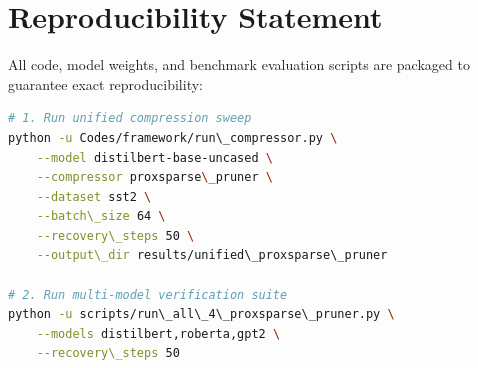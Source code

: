 \section{Reproducibility Statement}
All code, model weights, and benchmark evaluation scripts are packaged to guarantee exact reproducibility:
\begin{lstlisting}[language=bash]
# 1. Run unified compression sweep
python -u Codes/framework/run\_compressor.py \
    --model distilbert-base-uncased \
    --compressor proxsparse\_pruner \
    --dataset sst2 \
    --batch\_size 64 \
    --recovery\_steps 50 \
    --output\_dir results/unified\_proxsparse\_pruner

# 2. Run multi-model verification suite
python -u scripts/run\_all\_4\_proxsparse\_pruner.py \
    --models distilbert,roberta,gpt2 \
    --recovery\_steps 50
\end{lstlisting}
